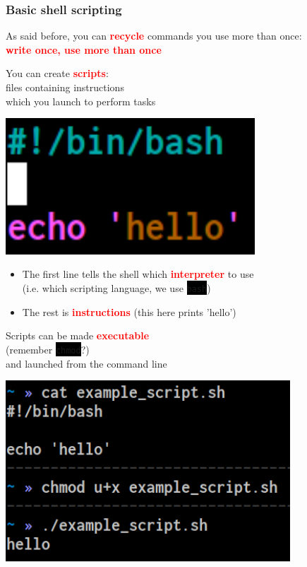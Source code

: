 \documentclass[unknownkeysallowed, 10pt, a4 paper, handout]{beamer}
\newcommand{\focus}[1]{\textbf{\textcolor{red}{#1}}}
\newcommand{\code}[1]{\colorbox{black}{\color{green}\texttt{#1}}}
\newcommand{\sidebyside}[5]{
  \begin{minipage}{#1\textwidth}
    #2
  \end{minipage} #3 \begin{minipage}{#4\textwidth}
    #5
  \end{minipage}
}
\begin{document}
\begin{frame}
  \begin{center}
    \frametitle{Basic shell scripting}

    As said before, you can \focus{recycle} commands you use more than once:\\
    \focus{write once, use more than once}

    \sidebyside{0.50}{
      You can create \focus{scripts}:\\
      files containing instructions\\
      which you launch to perform tasks
    }{\hfill}{0.45}{
      \begin{center}
        \includegraphics[width=0.70\textwidth]{pics/script_1.png}
      \end{center}
    }

    \begin{itemize}
      \item The first line tells the shell which \focus{interpreter} to use\\
        (i.e. which scripting language, we use \code{bash})
      \item The rest is \focus{instructions} (this here prints 'hello')
    \end{itemize}

    \sidebyside{0.50}{
      Scripts can be made \focus{executable}\\
      (remember \code{chmod}?)\\
      and launched from the command line
    }{\hfill}{0.45}{
      \begin{center}
        \includegraphics[width=0.80\textwidth]{pics/script_2.png}
      \end{center}
    }
  \end{center}
\end{frame}
\end{document}
